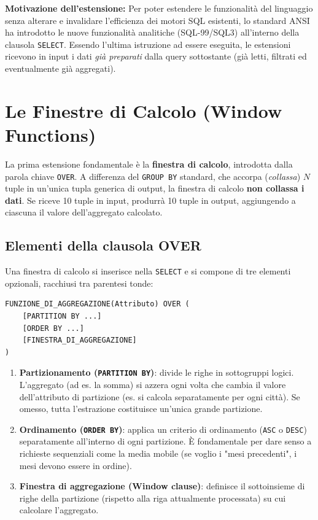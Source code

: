 \textbf{Motivazione dell'estensione:} Per poter estendere le funzionalità del linguaggio senza alterare e invalidare l'efficienza dei motori SQL esistenti, lo standard ANSI ha introdotto le nuove funzionalità analitiche (SQL-99/SQL3) all'interno della clausola \texttt{SELECT}. Essendo l'ultima istruzione ad essere eseguita, le estensioni ricevono in input i dati \textit{già preparati} dalla query sottostante (già letti, filtrati ed eventualmente già aggregati). 

\section{Le Finestre di Calcolo (Window Functions)}
La prima estensione fondamentale è la \textbf{finestra di calcolo}, introdotta dalla parola chiave \texttt{OVER}. 
A differenza del \texttt{GROUP BY} standard, che accorpa (\textit{collassa}) $N$ tuple in un'unica tupla generica di output, la finestra di calcolo \textbf{non collassa i dati}. Se riceve 10 tuple in input, produrrà 10 tuple in output, aggiungendo a ciascuna il valore dell'aggregato calcolato.

\subsection{Elementi della clausola OVER}
Una finestra di calcolo si inserisce nella \texttt{SELECT} e si compone di tre elementi opzionali, racchiusi tra parentesi tonde:
\begin{verbatim}
FUNZIONE_DI_AGGREGAZIONE(Attributo) OVER (
    [PARTITION BY ...]
    [ORDER BY ...]
    [FINESTRA_DI_AGGREGAZIONE]
)
\end{verbatim}

\begin{enumerate}
    \item \textbf{Partizionamento (\texttt{PARTITION BY})}: divide le righe in sottogruppi logici. L'aggregato (ad es. la somma) si azzera ogni volta che cambia il valore dell'attributo di partizione (es. si calcola separatamente per ogni città). Se omesso, tutta l'estrazione costituisce un'unica grande partizione.
    \item \textbf{Ordinamento (\texttt{ORDER BY})}: applica un criterio di ordinamento (\texttt{ASC} o \texttt{DESC}) separatamente all'interno di ogni partizione. È fondamentale per dare senso a richieste sequenziali come la media mobile (se voglio i "mesi precedenti", i mesi devono essere in ordine).
    \item \textbf{Finestra di aggregazione (Window clause)}: definisce il sottoinsieme di righe della partizione (rispetto alla riga attualmente processata) su cui calcolare l'aggregato.
\end{enumerate}

